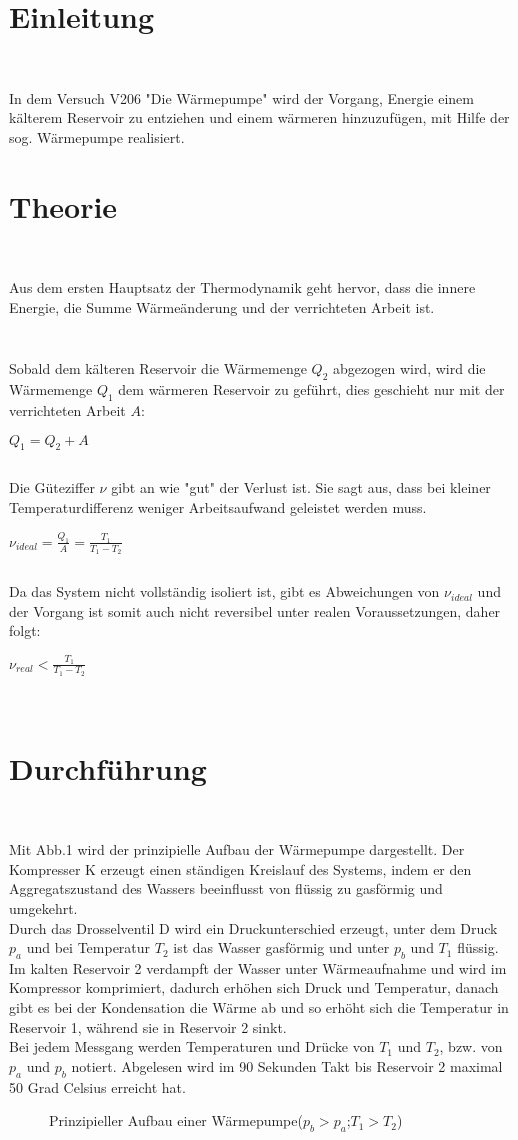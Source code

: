 \documentclass{scrartcl}
\begin{document}
\section{Einleitung}\
\raggedright{In dem Versuch V206 "Die Wärmepumpe" wird der Vorgang, Energie einem
kälterem Reservoir zu entziehen und einem wärmeren hinzuzufügen, mit Hilfe der sog. Wärmepumpe realisiert.}\

\section{Theorie}\
\raggedright{Aus dem ersten Hauptsatz der Thermodynamik geht hervor, dass die innere Energie, die Summe Wärmeänderung und der verrichteten Arbeit ist.}\ \[\]
\centerline{$ $}  \[\]
\raggedright{Sobald dem kälteren Reservoir die Wärmemenge $Q_2$ abgezogen wird, wird die Wärmemenge $Q_1$ dem wärmeren Reservoir zu geführt, dies geschieht nur mit der verrichteten Arbeit $A$:}\ \[\]
\centerline{$Q_1 = Q_2 + A$}
\raggedleft{(2)} \[\]
\raggedright{Die Güteziffer $\nu$ gibt an wie "gut" der Verlust ist. Sie sagt aus, dass bei kleiner Temperaturdifferenz weniger Arbeitsaufwand geleistet werden muss.}\ \[\]
\centerline{$\nu_{ideal} = \frac {Q_1}{A} = \frac{T_1}{T_1-T_2}$}  \[\]
\raggedright{Da das System nicht vollständig isoliert ist, gibt es Abweichungen von $\nu_{ideal}$ und der Vorgang ist somit auch nicht reversibel unter realen Voraussetzungen, daher folgt:}\ \[\]
\centerline{$\nu_{real} < \frac{T_1}{T_1-T_2}$}\
\raggedleft{(4)} \[\]




\section{Durchführung}\
\raggedright{Mit Abb.1 wird der prinzipielle Aufbau der Wärmepumpe dargestellt. Der Kompresser K erzeugt einen ständigen Kreislauf des Systems, indem er den Aggregatszustand des Wassers beeinflusst von flüssig zu gasförmig und umgekehrt. \\
Durch das Drosselventil D wird ein Druckunterschied erzeugt, unter dem Druck $p_a$ und bei Temperatur $T_2$ ist das Wasser gasförmig und unter $p_b$ und $T_1$ flüssig. \\
Im kalten Reservoir 2 verdampft der Wasser unter Wärmeaufnahme und wird im Kompressor komprimiert, dadurch erhöhen sich Druck und Temperatur, danach gibt es bei der Kondensation die Wärme ab und so erhöht sich die Temperatur in Reservoir 1, während sie in Reservoir 2 sinkt.\\
Bei jedem Messgang werden Temperaturen und Drücke von $T_1$ und $T_2$, bzw. von $p_a$ und $p_b$ notiert. Abgelesen wird im 90 Sekunden Takt bis Reservoir 2 maximal 50 Grad Celsius erreicht hat.}\ \\

\begin{figure}
\caption{Prinzipieller Aufbau einer Wärmepumpe($p_b > p_a$;$T_1 > T_2$)}
\label{fig:Abb}
\end{figure}
\end{document}
